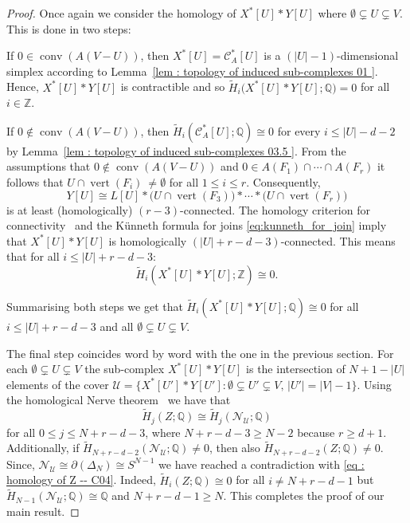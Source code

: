 \documentclass[a4paper,11pt,reqno, english]{amsart}
\theoremstyle{definition}
\theoremstyle{remark}
\newcommand\Z{\mathbb Z}
\newcommand\Q{\mathbb Q}
\newcommand\NN{\mathscr N}
\newcommand\U{\mathscr U}
\newcommand\CC{\mathscr C}
\DeclareMathOperator{\vertex}{\mathrm{vert}}
\DeclareMathOperator{\conv}{\mathrm{conv}}
\begin{document}
\begin{proof}
	\medskip
	Once again we consider the homology of $X^*[U]*Y[U]$ where $\emptyset \subsetneq  U \subsetneq  V$.
	This is done in two steps:
	\begin{compactenum}[\quad\rm (1)]
		\item If $0\in\conv(A(V-U))$, then $X^*[U]=\CC_A^*[U]$ is a $(|U|-1)$-dimensional simplex according to Lemma~\ref{lem : topology of induced sub-complexes 01 }. Hence, $X^*[U]*Y[U]$ is contractible and so $\widetilde{H}_{i}\big(X^*[U]*Y[U];\Q\big)=0$ for all $i\in\Z$.
		\item If $0\notin\conv(A(V-U))$, then $\widetilde{H}_i(\CC_A^*[U];\Q)\cong 0$ for every  $i\leq |U|-d-2$  by Lemma~\ref{lem : topology of induced sub-complexes 03.5 }. From the assumptions that $0\notin\conv(A(V-U))$ and  $0\in A(F_1)\cap\cdots\cap A(F_{r})$ it follows that $U \cap  \vertex(F_i)\    \neq\emptyset$ for all $1\leq i\leq r$.
		Consequently,
		\[
			Y[U]\cong L[U] *\big( U\cap \vertex ({F_{3}})\big)*\cdots *\big( U\cap \vertex ({F_{r}})\big)
		\]
		is at least (homologically) $(r-3)$-connected.
		The homology criterion for  connectivity~\cite[Thm.\,4.4.1]{Matousek2008} and the K\"unneth formula for joins \eqref{eq:kunneth_for_join} imply that $X^*[U]*Y[U]$ is homologically $(|U|+r-d-3)$-connected.
		This means that for all $i\leq |U|+r-d-3$:
		\[
			\widetilde{H}_i(X^*[U]*Y[U];\Z)\cong 0.
		\]
	\end{compactenum}
	Summarising both steps we get that  $\widetilde{H}_i(X^*[U]*Y[U];\Q)\cong 0$ for all $i\leq |U|+r-d-3$ and all $\emptyset \subsetneq  U \subsetneq  V$.

	\medskip
	The final step coincides word by word with the one in the previous section.
	For each  $\emptyset \subsetneq  U \subsetneq  V$ the sub-complex $X^*[U]*Y[U]$ is the intersection of $N+1-|U|$ elements of the cover $\U=\{X^*[U']*Y[U'] : \emptyset\subsetneq U' \subsetneq V,\, |U'|=|V|-1\}$.
	Using the homological Nerve theorem~\cite[Thm.\,2.1]{Meshulam2001} we have that
	\[
		\widetilde{H}_{j}(Z;\Q)\cong \widetilde{H}_{j}(\NN_{\U};\Q)
	\]
	for all $0\leq j\leq N+r-d-3$, where $N+r-d-3\geq N-2$ because $r\geq d+1$.
	Additionally, if $\widetilde{H}_{N+r-d-2}(\NN_{\U};\Q)\neq 0$, then also $\widetilde{H}_{N+r-d-2}(Z;\Q)\neq 0$.
	Since, $\NN_{\U}\cong\partial ( \Delta_{N})\cong S^{N-1}$ we have reached a contradiction with \eqref{eq : homology of Z -- C04}.
	Indeed, $\widetilde{H}_{i}(Z;\Q)\cong 0$ for all $i\neq  N+r-d-1$ but $\widetilde{H}_{N-1}(\NN_{\U};\Q)\cong \Q$ and $N+r-d-1\geq N$.
	This completes the proof of our main result.
\end{proof}
\end{document}
